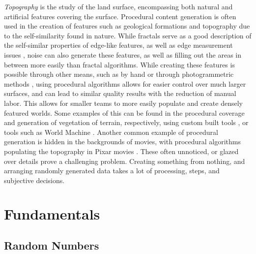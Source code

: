 \documentclass[10pt]{report}
\begin{document}
		\emph{Topography} is the study of the land surface, encompassing both natural and artificial features covering the surface. Procedural content generation is often used in the creation of features such as geological formations and topography due to the self-similarity found in nature. While fractals serve as a good description of the self-similar properties of edge-like features, as well as edge measurement issues \cite{ijgi5060095}, noise can also generate these features, as well as filling out the areas in between more easily than fractal algorithms. While creating these features is possible through other means, such as by hand or through photogrammetric methods \cite{bullinger2020photogrammetrybased}, using procedural algorithms allows for easier control over much larger surfaces, and can lead to similar quality results with the reduction of manual labor. This allows for smaller teams to more easily populate and create densely featured worlds. Some examples of this can be found in the procedural coverage and generation of vegetation of terrain, respectively, using custom built tools \cite{redengine}, or tools such as World Machine \cite{world-machine}. Another common example of procedural generation is hidden in the backgrounds of movies, with procedural algorithms populating the topography in Pixar movies \cite{10.1145/3388767.3407372}. These often unnoticed, or glazed over details prove a challenging problem. Creating something from nothing, and arranging randomly generated data takes a lot of processing, steps, and subjective decisions.
		
		\section{Fundamentals} %
			\subsection{Random Numbers} \label{subsec:rng}
		
\end{document}
